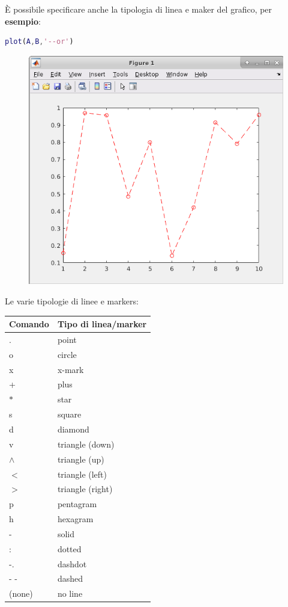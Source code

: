 \documentclass[a4paper]{article}
\begin{document}
	\noindent
	È possibile specificare anche la tipologia di linea e maker del grafico, per \textcolor{Green4}{\textbf{esempio}}:
	\begin{lstlisting}[language=MATLAB]
plot(A,B,'--or')\end{lstlisting}
	\begin{figure}[!htp]
		\centering
		\includegraphics[width=.7\textwidth]{img/lab/visualizzazione-segnali_2.png}
	\end{figure}

	\noindent
	Le varie tipologie di linee e markers:
	\begin{table}[!htbp]
		\centering
		\begin{tabular}{@{} l l @{}}
			\toprule
			Comando		& Tipo di linea/marker \\
			\midrule
			.		& point \\
			o		& circle \\
			x		& x-mark \\
			+		& plus \\
			$\ast$	& star \\
			s		& square \\
			d		& diamond \\
			v		& triangle (down) \\
			$\wedge$	& triangle (up) \\
			$<$		& triangle (left) \\
			$>$		& triangle (right) \\
			p		& pentagram \\
			h		& hexagram \\
			-		& solid \\
			:		& dotted \\
			-.		& dashdot \\
			- -		& dashed \\
			(none)	& no line \\
			\bottomrule
		\end{tabular}
	\end{table}\newpage
\end{document}
